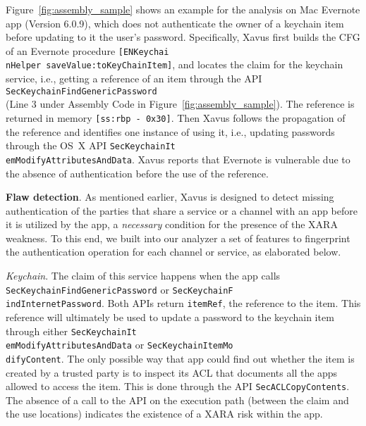 \documentclass{article}
\begin{document}
Figure~\ref{fig:assembly_sample} shows an example for the analysis on Mac Evernote app (Version 6.0.9), which does not authenticate the owner of a keychain item before updating to it the user's password. Specifically, Xavus first builds the CFG of an Evernote procedure \texttt{[ENKeychai\\nHelper saveValue:toKeyChainItem]}, and locates the claim for the keychain service, i.e., getting a reference of an item through the API \texttt{SecKeychainFindGenericPassword}\\ (Line 3 under Assembly Code in Figure~\ref{fig:assembly_sample}). The reference is returned in memory \texttt{[ss:rbp - 0x30]}. Then Xavus follows the propagation of the reference and identifies one instance of using it, i.e., updating passwords through the OS~X API \texttt{SecKeychainIt\\emModifyAttributesAndData}. Xavus reports that Evernote is vulnerable due to the absence of authentication before the use of the reference.





\vspace {3pt}\noindent\textbf{Flaw detection}. As mentioned earlier, Xavus is designed to detect missing authentication of the parties that share a service or a channel with an app before it is utilized by the app, a \textit{necessary} condition for the presence of the XARA weakness. To this end, we built into our analyzer a set of features to fingerprint the authentication operation for each channel or service, as elaborated below.

\vspace {3pt}\noindent\textit{ Keychain}. The claim of this service happens when the app calls \texttt{SecKeychainFindGenericPassword} or \texttt{SecKeychainF\\indInternetPassword}. Both APIs return \texttt{itemRef}, the reference to the item.  This reference will ultimately be used to update a password to the keychain item through either \texttt{SecKeychainIt\\emModifyAttributesAndData} or \texttt{SecKeychainItemMo\\difyContent}. The only possible way that app could find out whether the item is created by a trusted party is to inspect its ACL that documents all the apps allowed to access the item. This is done through the API \texttt{SecACLCopyContents}.  The absence of a call to the API on the execution path (between the claim and the use locations) indicates the existence of a XARA risk within the app.
\end{document}
